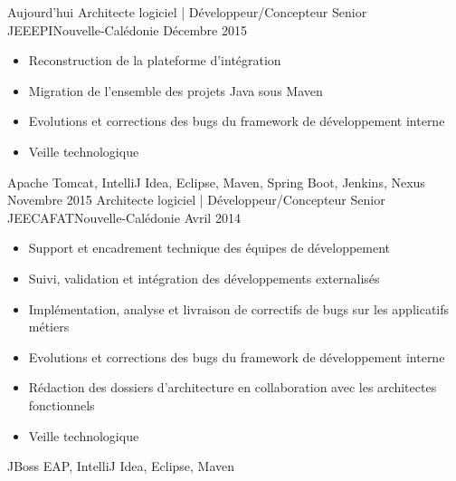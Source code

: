 \begin{experiences}
  \experience
    {Aujourd'hui}   {Architecte logiciel | Développeur/Concepteur Senior JEE}{EPI}{Nouvelle-Calédonie}
    {Décembre 2015} {
                      \begin{itemize}
                        \item Reconstruction de la plateforme d'intégration                        
                        \item Migration de l'ensemble des projets Java sous Maven                    
                        \item Evolutions et corrections des bugs du framework de développement interne                
                        \item Veille technologique                                                                    
                      \end{itemize}
                    }
                    {Apache Tomcat, IntelliJ Idea, Eclipse, Maven, Spring Boot, Jenkins, Nexus}
  \emptySeparator
  \experience
    {Novembre 2015} {Architecte logiciel | Développeur/Concepteur Senior JEE}{CAFAT}{Nouvelle-Calédonie}
    {Avril 2014}    {
                      \begin{itemize}
                        \item Support et encadrement technique des équipes de développement                           
                        \item Suivi, validation et intégration des développements externalisés                        
                        \item Implémentation, analyse et livraison de correctifs de bugs sur les applicatifs métiers  
                        \item Evolutions et corrections des bugs du framework de développement interne                
                        \item Rédaction des dossiers d'architecture en collaboration avec les architectes fonctionnels
                        \item Veille technologique                                                                    
                      \end{itemize}
                    }
                    {JBoss EAP, IntelliJ Idea, Eclipse, Maven}

\end{experiences}
